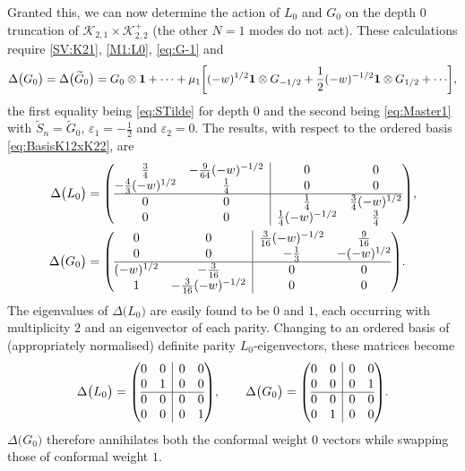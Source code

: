 \documentclass[a4paper,reqno,12pt]{report}
\makeatletter
\theoremstyle{definition}
\numberwithin{equation}{section}
\newenvironment{amatrix}[1]{\left( \begin{array}{@{}#1@{}}}{\end{array} \right)}
\let\originalleft\left     %
\let\originalright\right
\renewcommand{\left}{\mathopen{}\mathclose\bgroup\originalleft}
\renewcommand{\right}{\aftergroup\egroup\originalright}
\newcommand{\sqbrac}[1]{\left[ #1 \right]}
\newcommand{\wun}{\mathbf{1}}  %
\newcommand{\Kac}[1]{\mathcal{K}_{#1}}       %
\newcommand{\fuse}{\mathbin{\times}}                                            %
\newcommand{\coproductsymb}{\Delta}                                                %
\newcommand{\coproduct}[1]{\coproductsymb \bigl( #1 \bigr)}                        %
\newcommand{\eps}{\varepsilon}
\newcommand{\tS}{\widetilde{S}}
\theoremstyle{plain}
\newcommand{\tG}{\widetilde{G}}
\makeatother
\begin{document}
Granted this, we can now determine the action of $L_0$ and $G_0$ on the depth $0$ truncation of $\Kac{2,1} \fuse \Kac{2,2}^+$ (the other $N=1$ modes do not act).  These calculations require \eqref{SV:K21}, \eqref{M1:L0}, \eqref{eq:G-1} and
\begin{equation}
\coproduct{G_0} = \coproduct{\tG_0} = G_0 \otimes \wun + \cdots + \mu_1 \sqbrac{(-w)^{1/2} \wun \otimes G_{-1/2} + \frac{1}{2} (-w)^{-1/2} \wun \otimes G_{1/2} + \cdots},
\end{equation}
the first equality being \eqref{eq:STilde} for depth $0$ and the second being \eqref{eq:Master1} with $\tS_n = \tG_0$, $\eps_1 = -\frac{1}{2}$ and $\eps_2 = 0$.  The results, with respect to the ordered basis \eqref{eq:BasisK12xK22}, are
\begin{subequations}
\begin{align}
\coproduct{L_0} &= 
\begin{amatrix}{cc|cc}
\frac{3}{4} & -\frac{9}{64}(-w)^{-1/2} & 0 & 0 \\
-\frac{4}{3}(-w)^{1/2} & \frac{1}{4} & 0 & 0 \\
\hline
0 & 0 & \frac{1}{4}	& \frac{3}{4} (-w)^{1/2} \\
0 & 0 & \frac{1}{4}(-w)^{-1/2} & \frac{3}{4}
\end{amatrix}
, \\
\coproduct{G_0} &= 
\begin{amatrix}{cc|cc}
0 & 0 & \frac{3}{16} (-w)^{-1/2} & \frac{9}{16}\\
0 & 0 & -\frac{1}{3} & -(-w)^{1/2} \\
\hline
(-w)^{1/2} & -\frac{3}{16} & 0 & 0 \\
1 & -\frac{3}{16}(-w)^{-1/2} & 0 & 0
\end{amatrix}
.
\end{align}
\end{subequations}
The eigenvalues of $\coproduct{L_0}$ are easily found to be $0$ and $1$, each occurring with multiplicity $2$ and an eigenvector of each parity.  Changing to an ordered basis of (appropriately normalised) definite parity $L_0$-eigenvectors, these matrices become
\begin{equation}
\coproduct{L_0} = 
\begin{amatrix}{cc|cc}
0 & 0 & 0 & 0 \\
0 & 1 & 0 & 0 \\
\hline
0 & 0 & 0 & 0 \\
0 & 0 & 0 & 1
\end{amatrix}
, \qquad \coproduct{G_0} = 
\begin{amatrix}{cc|cc}
0 & 0 & 0 & 0 \\
0 & 0 & 0 & 1 \\
\hline
0 & 0 & 0 & 0 \\
0 & 1 & 0 & 0
\end{amatrix}
.
\end{equation}
$\coproduct{G_0}$ therefore annihilates both the conformal weight $0$ vectors while swapping those of conformal weight $1$.
\end{document}
